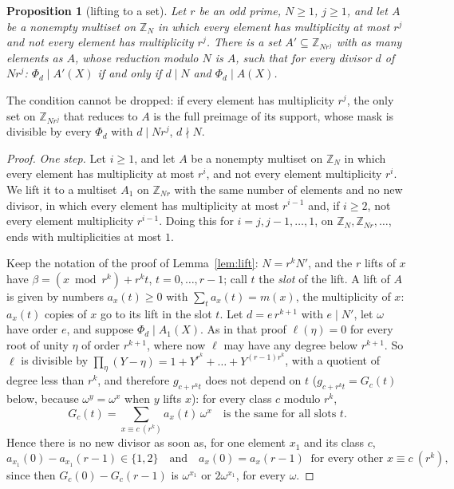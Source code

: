 \documentclass[11pt,a4paper]{amsart}
\newtheorem{proposition}[theorem]{Proposition}
\theoremstyle{definition}
\theoremstyle{remark}
\newcommand{\Z}{\mathbb{Z}}
\begin{document}
\begin{proposition}[lifting to a set]\label{prop:setlift}
Let $r$ be an odd prime, $N\ge1$, $j\ge1$, and let $A$ be a nonempty multiset on $\Z_N$ in which every element has
multiplicity at most $r^j$ and not every element has multiplicity $r^j$. There is a set $A'\subseteq\Z_{Nr^j}$
with as many elements as $A$, whose reduction modulo $N$ is $A$, such that for every divisor $d$ of $Nr^j$:
$\Phi_d\mid A'(X)$ if and only if $d\mid N$ and $\Phi_d\mid A(X)$.
\end{proposition}
The condition cannot be dropped: if every element has multiplicity $r^j$, the only set on $\Z_{Nr^j}$ that reduces to $A$ is
the full preimage of its support, whose mask is divisible by every $\Phi_d$ with $d\mid Nr^j$, $d\nmid N$.
\begin{proof}
\emph{One step.} Let $i\ge1$, and let $A$ be a nonempty multiset on $\Z_N$ in which every element has multiplicity
at most $r^i$, and not every element multiplicity $r^i$. We lift it to a multiset $A_1$ on $\Z_{Nr}$ with the same number of elements and no new
divisor, in which every element has multiplicity at most $r^{i-1}$ and, if $i\ge2$, not every element multiplicity $r^{i-1}$. Doing this for
$i=j,j-1,\dots,1$, on $\Z_N,\Z_{Nr},\dots$, ends with multiplicities at most $1$.

Keep the notation of the proof of Lemma~\ref{lem:lift}: $N=r^kN'$, and the $r$ lifts of $x$ have
$\beta=(x\bmod r^k)+r^kt$, $t=0,\dots,r-1$; call $t$ the \emph{slot} of the lift. A lift of $A$ is given by
numbers $a_x(t)\ge0$ with $\sum_ta_x(t)=m(x)$, the multiplicity of $x$: $a_x(t)$ copies of $x$ go to its lift in
the slot $t$. Let $d=e\,r^{k+1}$ with $e\mid N'$, let $\omega$ have order $e$, and suppose $\Phi_d\mid A_1(X)$.
As in that proof $\ell(\eta)=0$ for every root of unity $\eta$ of order $r^{k+1}$, where now $\ell$ may have any
degree below $r^{k+1}$. So $\ell$ is divisible by $\prod_\eta(Y-\eta)=1+Y^{r^k}+\dots+Y^{(r-1)r^k}$, with a quotient
of degree less than $r^k$, and therefore $g_{c+r^kt}$ does not depend on $t$ ($g_{c+r^kt}=G_c(t)$ below, because
$\omega^y=\omega^x$ when $y$ lifts $x$): for every class $c$ modulo $r^k$,
\[ G_c(t)=\sum_{x\equiv c\ (r^k)}a_x(t)\,\omega^{x}\quad\text{is the same for all slots } t. \]
Hence there is no new divisor as soon as, for one element $x_1$ and its class $c$,
\[ a_{x_1}(0)-a_{x_1}(r-1)\in\{1,2\}\quad\text{and}\quad a_x(0)=a_x(r-1)\ \text{ for every other } x\equiv c\ (r^k), \]
since then $G_c(0)-G_c(r-1)$ is $\omega^{x_1}$ or $2\omega^{x_1}$, for every $\omega$.


\end{proof}
\end{document}
